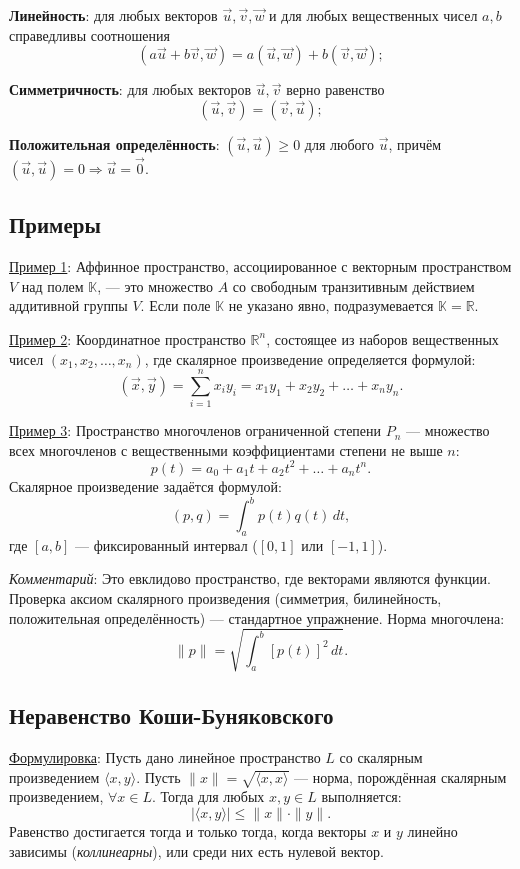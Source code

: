 \documentclass[12pt]{article}
\begin{document}
    
\textbf{Линейность}: для любых векторов $\vec{u}, \vec{v}, \vec{w}$ и для любых вещественных чисел $a, b$ справедливы соотношения  
    $$
    (a\vec{u} + b\vec{v}, \vec{w}) = a(\vec{u}, \vec{w}) + b(\vec{v}, \vec{w});
    $$
    
\textbf{Симметричность}: для любых векторов $\vec{u}, \vec{v}$ верно равенство  
    $$
    (\vec{u}, \vec{v}) = (\vec{v}, \vec{u});
    $$
    
\textbf{Положительная определённость}: $(\vec{u}, \vec{u}) \geq 0$ для любого $\vec{u}$, причём $(\vec{u}, \vec{u}) = 0 \Rightarrow \vec{u} = \vec{0}$.


\subsection*{Примеры}
\underline{Пример 1}: Аффинное пространство, ассоциированное с векторным пространством $V$ над полем $\mathbb{K}$, — это множество $A$ со свободным транзитивным действием аддитивной группы $V$. Если поле $\mathbb{K}$ не указано явно, подразумевается $\mathbb{K} = \mathbb{R}$.

\underline{Пример 2}: Координатное пространство $\mathbb{R}^n$, состоящее из наборов вещественных чисел $(x_1, x_2, \dots, x_n)$, где скалярное произведение определяется формулой:
$$
(\vec{x}, \vec{y}) = \sum_{i=1}^n x_i y_i = x_1 y_1 + x_2 y_2 + \dots + x_n y_n.
$$

\underline{Пример 3}: Пространство многочленов ограниченной степени $P_n$ — множество всех многочленов с вещественными коэффициентами степени не выше $n$:  
$$
p(t) = a_0 + a_1 t + a_2 t^2 + \dots + a_n t^n.
$$  
Скалярное произведение задаётся формулой:  
$$
(p, q) = \int_a^b p(t)q(t)\,dt,
$$  
где $[a, b]$ — фиксированный интервал ($[0, 1]$ или $[-1, 1]$).  

\textit{Комментарий}: Это евклидово пространство, где векторами являются функции. Проверка аксиом скалярного произведения (симметрия, билинейность, положительная определённость) — стандартное упражнение. Норма многочлена:  
$$
\|p\| = \sqrt{\int_a^b [p(t)]^2\,dt}.
$$


\subsection*{Неравенство Коши-Буняковского}
\underline{Формулировка}:  
Пусть дано линейное пространство $L$ со скалярным произведением $\langle x, y \rangle$. Пусть $\|x\| = \sqrt{\langle x, x \rangle}$ — норма, порождённая скалярным произведением, $\forall x \in L$. Тогда для любых $x, y \in L$ выполняется:
$$
|\langle x, y \rangle| \leq \|x\| \cdot \|y\|.
$$
Равенство достигается тогда и только тогда, когда векторы $x$ и $y$ линейно зависимы (\textit{коллинеарны}), или среди них есть нулевой вектор.
\end{document}
